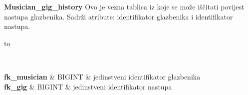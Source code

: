 		\textbf{Musician\_gig\_history}
	Ovo je vezna tablica iz koje se može iščitati povijest nastupa glazbenika.  Sadrži atribute: identifikator glazbenika i identifikator nastupa.
	\begin{longtabu} to \textwidth {|X[6, l+3]|X[6, l]|X[20, l]|}
		
		\hline {}	 \\[3pt] \hline
		\endfirsthead
		
		\hline 
		\endlastfoot
		
		\textbf{fk\_musician} & BIGINT & jedinstveni identifikator glazbenika \\ \hline
		\textbf{fk\_gig} & BIGINT & jedinstveni identifikator nastupa \\ \hline
		
		
		
	\end{longtabu}
	
